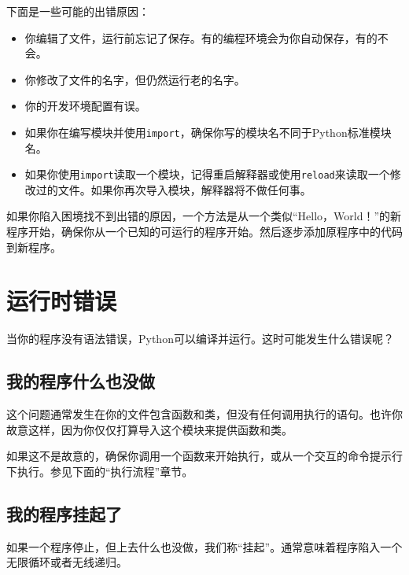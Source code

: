 下面是一些可能的出错原因：

\begin{itemize}

\item 你编辑了文件，运行前忘记了保存。有的编程环境会为你自动保存，有的不会。

\item 你修改了文件的名字，但仍然运行老的名字。

\item 你的开发环境配置有误。

\item 如果你在编写模块并使用{\tt import}，确保你写的模块名不同于Python标准模块名。


\item 如果你使用{\tt import}读取一个模块，记得重启解释器或使用{\tt reload}来读取一个修改过的文件。如果你再次导入模块，解释器将不做任何事。

\end{itemize}

如果你陷入困境找不到出错的原因，一个方法是从一个类似“Hello，World！”的新程序开始，确保你从一个已知的可运行的程序开始。然后逐步添加原程序中的代码到新程序。


\section{运行时错误}

当你的程序没有语法错误，Python可以编译并运行。这时可能发生什么错误呢？


\subsection{我的程序什么也没做}

这个问题通常发生在你的文件包含函数和类，但没有任何调用执行的语句。也许你故意这样，因为你仅仅打算导入这个模块来提供函数和类。

如果这不是故意的，确保你调用一个函数来开始执行，或从一个交互的命令提示行下执行。参见下面的“执行流程”章节。


\subsection{我的程序挂起了}

如果一个程序停止，但上去什么也没做，我们称“挂起”。通常意味着程序陷入一个无限循环或者无线递归。

